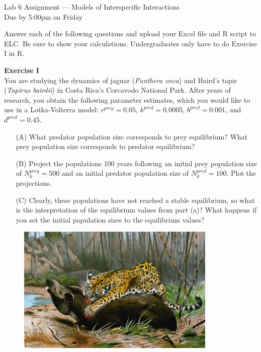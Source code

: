 \documentclass[12pt]{article}\usepackage[]{graphicx}\usepackage[]{xcolor}
\begin{document}
{
  \Large
  \centering
  Lab 6 Assignment --- Models of Interspecific Interactions \\
  Due by 5:00pm on Friday \par
}

Answer each of the following questions and upload your Excel file and
R script to ELC. Be sure to show your calculations. Undergraduates
only have to do Exercise I in R.  \\


\vspace{6pt}

{\bf Exercise I \\}
You are studying the dynamics of jaguar (\textit{Panthera onca}) and Baird's
tapir (\textit{Tapirus bairdii}) in Costa Rica's Corcavodo National Park. After
years of research, you obtain the following parameter estimates, which
you would like to use in a Lotka-Volterra model: $r^{prey}=0.05$,
$k^{pred}=0.0005$, $b^{pred}=0.001$, and $d^{pred}=0.45$.  
\begin{enumerate}
  \item[(A)] What predator population size corresponds to prey equilibrium?
    What prey population size corresponds to predator equilibrium? 
  \item[(B)] Project the populations 100 years following an initial prey
    population size of $N_0^{prey}=500$ and an initial predator
    population size of $N_0^{pred}=100$. Plot the projections.  
  \item[(C)] Clearly, these populations have not reached a stable
    equilibrium, so what is the interpretation of the equilibrium
    values from part (a)? What happens if you set the initial
    population sizes to the equilibrium values?  
\end{enumerate}

\vspace{12pt}

\begin{figure}[h!]
  \centering
  \includegraphics[width=0.85\textwidth]{jaguar_killing_tapir}
  \label{fig:jag-tapir}
\end{figure}
\end{document}
